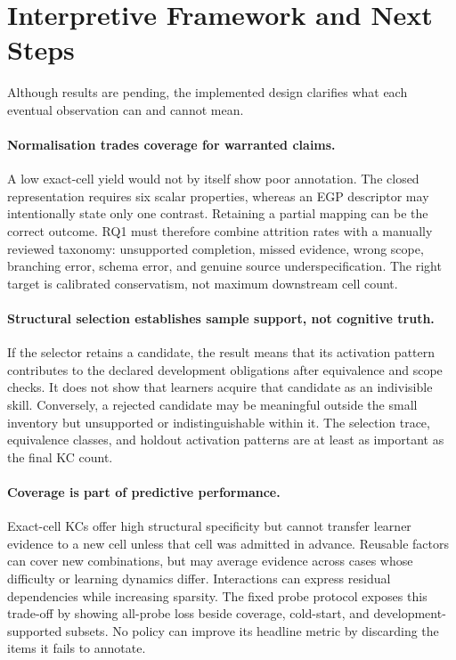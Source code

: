 \section{Interpretive Framework and Next Steps}
\label{sec:discussion}

Although results are pending, the implemented design clarifies what each
eventual observation can and cannot mean.

\paragraph{Normalisation trades coverage for warranted claims.}
A low exact-cell yield would not by itself show poor annotation.  The closed
representation requires six scalar properties, whereas an EGP descriptor may
intentionally state only one contrast.  Retaining a partial mapping can be the
correct outcome.  RQ1 must therefore combine attrition rates with a manually
reviewed taxonomy: unsupported completion, missed evidence, wrong scope,
branching error, schema error, and genuine source underspecification.  The
right target is calibrated conservatism, not maximum downstream cell count.

\paragraph{Structural selection establishes sample support, not cognitive
truth.}
If the selector retains a candidate, the result means that its activation
pattern contributes to the declared development obligations after equivalence
and scope checks.  It does not show that learners acquire that candidate as an
indivisible skill.  Conversely, a rejected candidate may be meaningful outside
the small inventory but unsupported or indistinguishable within it.  The
selection trace, equivalence classes, and holdout activation patterns are at
least as important as the final KC count.

\paragraph{Coverage is part of predictive performance.}
Exact-cell KCs offer high structural specificity but cannot transfer learner
evidence to a new cell unless that cell was admitted in advance.  Reusable
factors can cover new combinations, but may average evidence across cases whose
difficulty or learning dynamics differ.  Interactions can express residual
dependencies while increasing sparsity.  The fixed probe protocol exposes this
trade-off by showing all-probe loss beside coverage, cold-start, and
development-supported subsets.  No policy can improve its headline metric by
discarding the items it fails to annotate.

